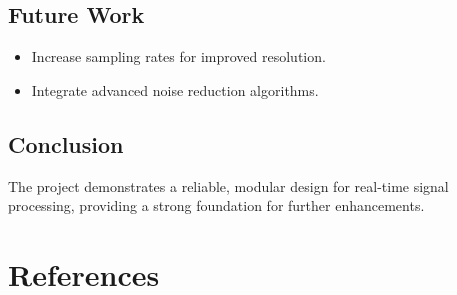 \documentclass[12pt]{article}
\begin{document}
\subsection{Future Work}
\begin{itemize}[leftmargin=2em]
    \item Increase sampling rates for improved resolution.
    \item Integrate advanced noise reduction algorithms.
\end{itemize}

\subsection{Conclusion}
The project demonstrates a reliable, modular design for real-time signal processing, providing a strong foundation for further enhancements.

\section{References}
\printbibliography[title={}]
\end{document}
